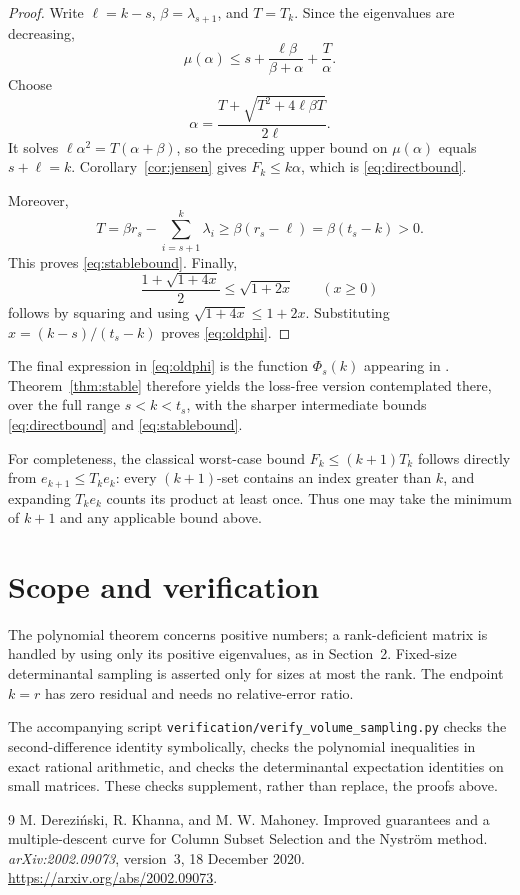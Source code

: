 \documentclass[11pt]{article}
\theoremstyle{definition}
\begin{document}
\begin{proof}
Write $\ell=k-s$, $\beta=\lambda_{s+1}$, and $T=T_k$. Since the eigenvalues are decreasing,
\[
 \mu(\alpha)\le s+\frac{\ell\beta}{\beta+\alpha}+\frac{T}{\alpha}.
\]
Choose
\[
 \alpha=\frac{T+\sqrt{T^2+4\ell\beta T}}{2\ell}.
\]
It solves $\ell\alpha^2=T(\alpha+\beta)$, so the preceding upper bound on $\mu(\alpha)$ equals $s+\ell=k$. Corollary~\ref{cor:jensen} gives $F_k\le k\alpha$, which is \eqref{eq:directbound}.

Moreover,
\[
 T=\beta r_s-\sum_{i=s+1}^k\lambda_i
       \ge\beta(r_s-\ell)=\beta(t_s-k)>0.
\]
This proves \eqref{eq:stablebound}. Finally,
\[
 \frac{1+\sqrt{1+4x}}2\le\sqrt{1+2x}\qquad(x\ge0)
\]
follows by squaring and using $\sqrt{1+4x}\le1+2x$. Substituting $x=(k-s)/(t_s-k)$ proves \eqref{eq:oldphi}.
\end{proof}

The final expression in \eqref{eq:oldphi} is the function $\Phi_s(k)$ appearing in \cite[Theorem~1]{DKM2020}. Theorem~\ref{thm:stable} therefore yields the loss-free version contemplated there, over the full range $s<k<t_s$, with the sharper intermediate bounds \eqref{eq:directbound} and \eqref{eq:stablebound}.

For completeness, the classical worst-case bound $F_k\le(k+1)T_k$ follows directly from $e_{k+1}\le T_ke_k$: every $(k+1)$-set contains an index greater than $k$, and expanding $T_ke_k$ counts its product at least once. Thus one may take the minimum of $k+1$ and any applicable bound above.

\section{Scope and verification}
The polynomial theorem concerns positive numbers; a rank-deficient matrix is handled by using only its positive eigenvalues, as in Section~2. Fixed-size determinantal sampling is asserted only for sizes at most the rank. The endpoint $k=r$ has zero residual and needs no relative-error ratio.

The accompanying script \texttt{verification/verify\_volume\_sampling.py} checks the second-difference identity symbolically, checks the polynomial inequalities in exact rational arithmetic, and checks the determinantal expectation identities on small matrices. These checks supplement, rather than replace, the proofs above.

\begin{thebibliography}{9}
M. Derezi\'nski, R. Khanna, and M. W. Mahoney.
\newblock Improved guarantees and a multiple-descent curve for Column Subset Selection and the Nystr\"om method.
\newblock \emph{arXiv:2002.09073}, version~3, 18 December 2020.
\newblock \url{https://arxiv.org/abs/2002.09073}.
\end{thebibliography}
\end{document}
